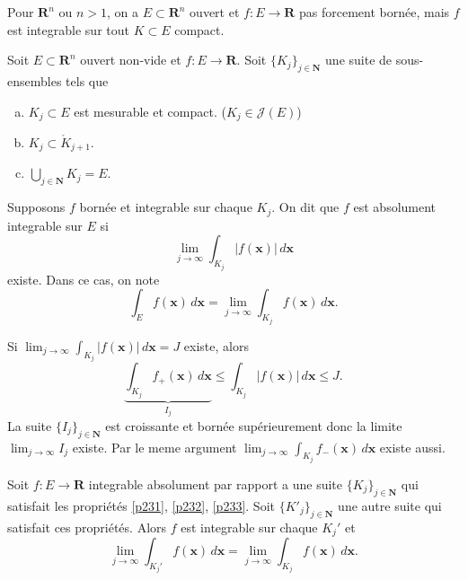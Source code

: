 Pour $\mathbf{R}^{n}$ ou $n>1$, on a $E\subset \mathbf{R}^{n}$ ouvert et $f:E\to \mathbf{R}$ pas forcement bornée, mais $f$ est integrable sur tout $K\subset E$ compact.
\begin{definition}
Soit $E\subset \mathbf{R}^{n}$ ouvert non-vide et $f:E\to \mathbf{R}$. Soit $\{ K_{j}\}_{j\in \mathbf{N}}$ une suite de sous-ensembles tels que
\begin{enumerate}[(a)]
\item \label{p231} $K_{j}\subset E$ est mesurable et compact. ($K_{j}\in \mathcal{J}(E)$)
\item \label{p232} $K_{j}\subset {\mathring{ K }_{j+1}}$.
\item \label{p233} $\bigcup _{j\in \mathbf{N}}K_{j}=E$.
\end{enumerate}
Supposons $f$ bornée et integrable sur chaque $K_{j}$. On dit que $f$ est absolument integrable sur $E$ si 
$$
\lim_{ j \to \infty } \int _{K_{j}}|f(\boldsymbol{x})|\,d\boldsymbol{x}
$$
existe. Dans ce cas, on note 
$$
\int _{E}f(\boldsymbol{x})\,d\boldsymbol{x}=\lim_{ j \to \infty } \int _{K_{j}}f(\boldsymbol{x})\,d\boldsymbol{x}.
$$
\end{definition}
\begin{remark}
Si $\lim_{ j \to \infty }\int _{K_{j}}|f(\boldsymbol{x})| \, d\boldsymbol{x}=J$ existe, alors $$\underbrace{ \int _{K_{j}}f_{+}(\boldsymbol{x})\,d\boldsymbol{x} }_{ I_{j} } \le \int _{K_{j}}|f(\boldsymbol{x})|\,d\boldsymbol{x}\le J.$$
La suite $\{ I_{j} \}_{j\in \mathbf{N}}$ est croissante et bornée supérieurement donc la limite $\lim_{ j \to \infty }I_{j}$ existe. Par le meme argument $\lim_{ j \to \infty }\int _{K_{j}}f_{-}(\boldsymbol{x}) \, d\boldsymbol{x}$ existe aussi.
\end{remark}
\begin{theorem}
Soit $f:E\to \mathbf{R}$ integrable absolument par rapport a une suite $\{ K_{j} \}_{j\in \mathbf{N}}$ qui satisfait les propriétés \ref{p231}, \ref{p232}, \ref{p233}. Soit $\{ K'_{j} \}_{j\in \mathbf{N}}$ une autre suite qui satisfait ces propriétés. Alors $f$ est integrable sur chaque $K_{j}'$ et
$$
\lim_{ j \to \infty } \int _{K_{j}'}f(\boldsymbol{x})\,d\boldsymbol{x}=\lim_{ j \to \infty } \int _{K_{j}}f(\boldsymbol{x}) \, d\boldsymbol{x} .
$$
\end{theorem}
